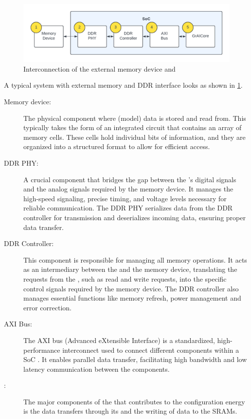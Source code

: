 \begin{figure}[hbtp]
    \centering
    \includegraphics[width=\linewidth]{assets/ddr_graicore_block_diagram.pdf}
    \caption{
        Interconnection of the external memory device and \graicore{}
    }
    \label{fig:ddr_graicore_block_diagram}
\end{figure}

A typical system with external memory and DDR interface looks as shown in \cref{fig:ddr_graicore_block_diagram}.
\begin{description}
    \item[Memory device:] 
    The physical component where (model) data is stored and read from.
    This typically takes the form of an integrated circuit that contains an array of memory cells.
    These cells hold individual bits of information, and they are organized into a structured format to allow for efficient access.
    \item[DDR PHY:] 
    A crucial component that bridges the gap between the \graicore{}'s digital signals and the analog signals required by the memory device.
    It manages the high-speed signaling, precise timing, and voltage levels necessary for reliable communication.
    The DDR PHY serializes data from the DDR controller for transmission and deserializes incoming data, ensuring proper data transfer.
    \item[DDR Controller:] 
    This component is responsible for managing all memory operations.
    It acts as an intermediary between the \graicore{} and the memory device, translating the requests from the \graicore{}, such as read and write requests, into the specific control signals required by the memory device.
    The DDR controller also manages essential functions like memory refresh, power management and error correction.
    \item[AXI Bus:] 
    The AXI bus (Advanced eXtensible Interface) is a standardized, high-performance interconnect used to connect different components within a SoC \cite{ARM_AXI_Specification}.
    It enables parallel data transfer, facilitating high bandwidth and low latency communication between the components.
    \item[\graicore{}:] 
    The major components of the \graicore{} that contributes to the configuration energy is the data transfers through its \confignoc{} and the writing of data to the SRAMs.
\end{description}

